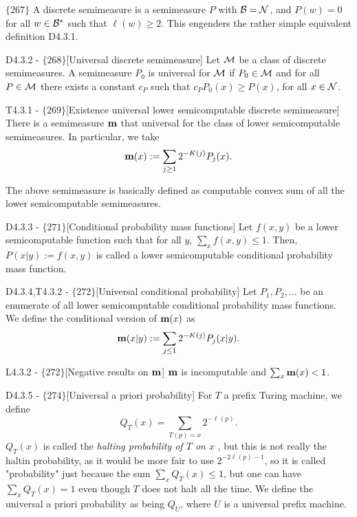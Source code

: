 \documentclass{article}
\begin{document}
$\{267\}$ A discrete semimeasure is a semimeasure $P$ with $\mathcal{B} = \mathcal{N}$, and $P(w) = 0$ for all $w \in \mathcal{B}^\ast$ such that $\ell(w) \geq 2$. This engenders the rather simple equivalent definition D4.3.1. 

\begin{flexidefinition}{D4.3.2 - $\{268\}$}[Universal discrete semimeasure]
    Let $\mathcal{M}$ be a class of discrete semimeasures. A semimeasure $P_0$ is universal for $\mathcal{M}$ if $P_0 \in \mathcal{M}$ and for all $P \in \mathcal{M}$ there exists a constant $c_P$ such that $c_PP_0(x) \geq P(x)$, for all $x \in \mathcal{N}$.
\end{flexidefinition}

\begin{flexitheorem}{T4.3.1 - $\{269\}$}[Existence universal lower semicomputable discrete semimeasure]
    There is a semimeasure ${\bf m}$ that universal for the class of lower semicomputable semimeasures. In particular, we take
    \begin{equation}
        {\bf m} (x) := \sum_{j\geq 1} 2^{-K(j)}P_j(x).
    \end{equation}
\end{flexitheorem}
The above semimeasure is basically defined as computable convex sum of all the lower semicomputable semimeasures.

\begin{flexidefinition}{D4.3.3 - $\{271\}$}[Conditional probability mass functions]
    Let $f(x,y)$ be a lower semicomputable function such that for all $y$, $\sum_x f(x,y) \leq 1$. Then, $P(x|y) := f(x,y)$ is called a lower semicomputable conditional probability mass function.
\end{flexidefinition}
\begin{flexitheorem}{D4.3.4,T4.3.2 - $\{272\}$}[Universal conditional probability]
    Let $P_1,P_2,\ldots$ be an enumerate of all lower semicomputable conditional probability mass functions. We define the conditional version of ${\bf m}(x)$ as
    \begin{equation}
        {\bf m}(x|y) := \sum_{j \leq 1}2^{-K(j)}P_j(x|y).
    \end{equation}
\end{flexitheorem}

\begin{flexilemma}{L4.3.2 - $\{272\}$}[Negative results on ${\bf m}$]
    ${\bf m}$ is incomputable and $\sum_x {\bf m} (x) < 1$.
\end{flexilemma}

\begin{flexidefinition}{D4.3.5 - $\{274\}$}[Universal a priori probability]
    For $T$ a prefix Turing machine, we define
    \begin{equation}
        Q_T(x) = \sum_{T(p)=x}2^{-\ell(p)}.
    \end{equation}
    $Q_T(x)$ is called the \textit{halting probability of $T$ on $x$ }, but this is not really the haltin probability, as it would be more fair to use $2^{-2\ell(p)-1}$, so it is called "probability" just because the sum $\sum_x Q_T(x) \leq 1$, but one can have $\sum_x Q_T(x) = 1$ even though $T$ does not halt all the time. We define the universal a priori probability as being $Q_U$, where $U$ is a universal prefix machine.
\end{flexidefinition}
\end{document}
